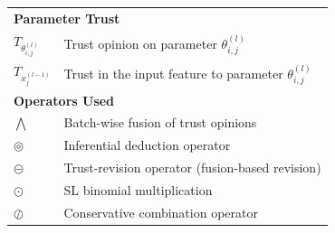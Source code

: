 \begin{table}[H]
\begin{tabular}{ll}
\multicolumn{2}{l}{\textbf{Parameter Trust}} \\
$T_{\theta^{(l)}_{i,j}}$ & Trust opinion on parameter $\theta^{(l)}_{i,j}$ \\
$T_{x^{(l-1)}_j}$ & Trust in the input feature to parameter $\theta^{(l)}_{i,j}$ \\[4pt]

\multicolumn{2}{l}{\textbf{Operators Used}} \\
$\bigwedge$ & Batch-wise fusion of trust opinions \\
$\circledcirc$ & Inferential deduction operator \\
$\circleddash$ & Trust-revision operator (fusion-based revision)\\
$\odot$ & SL binomial multiplication \\
$\oslash$ & Conservative combination operator \\
\hline
\end{tabular}
\end{table}


